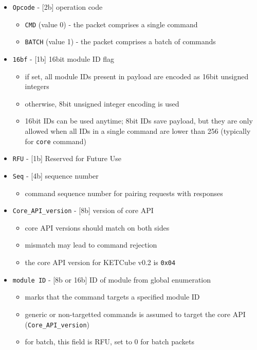 \begin{itemize}
	\item \texttt{Opcode} - [2b] operation code
		\begin{itemize}
			\item \texttt{CMD} (value 0) - the packet comprises a single command
			\item \texttt{BATCH} (value 1) - the packet comprises a batch of commands
		\end{itemize}
	\item \texttt{16bf} - [1b] 16bit module ID flag
		\begin{itemize}
			\item if set, all module IDs present in payload are encoded as 16bit unsigned integers
			\item otherwise, 8bit unsigned integer encoding is used
			\item 16bit IDs can be used anytime; 8bit IDs save payload, but they are only allowed when all IDs in a single command are lower than 256 (typically for \texttt{core} command)
		\end{itemize}
	\item \texttt{RFU} - [1b] Reserved for Future Use
	\item \texttt{Seq} - [4b] sequence number
		\begin{itemize}
			\item command sequence number for pairing requests with responses
		\end{itemize}
	\item \texttt{Core\_API\_version} - [8b] version of core API
		\begin{itemize}
			\item core API versions should match on both sides
			\item mismatch may lead to command rejection
			\item the core API version for KETCube v0.2 is \texttt{0x04}
		\end{itemize}
    \item \texttt{module ID} - [8b or 16b] ID of module from global enumeration
		\begin{itemize}
			\item marks that the command targets a specified module ID
			\item generic or non-targetted commands is assumed to target the core API (\texttt{Core\_API\_version})
			\item for batch, this field is RFU, set to 0 for batch packets
		\end{itemize}
\end{itemize}

